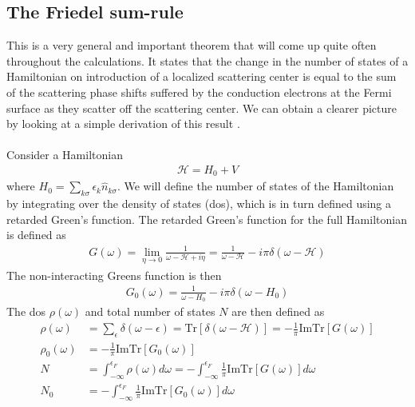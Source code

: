 \documentclass[twoside,11pt]{report}
\numberwithin{equation}{section}
\begin{document}
\subsection{The Friedel sum-rule}
This is a very general and important theorem that will come up  quite often throughout the calculations. It states that the change in the number of states of a Hamiltonian on introduction of a localized scattering center is equal to the sum of the scattering phase shifts suffered by the conduction electrons at the Fermi surface as they scatter off the scattering center. We can obtain a clearer picture by looking at a simple derivation of this result \cite{hewson}.
\\\\Consider a Hamiltonian
\begin{equation}\begin{aligned}
	\mathcal{H} = H_0 + V
\end{aligned}\end{equation}
where \(H_0 = \sum_{k\sigma}\epsilon_k \hat n_{k\sigma}\). We will define the number of states of the Hamiltonian by integrating over the density of states (dos), which is in turn defined using a retarded Green's function. The retarded Green's function for the full Hamiltonian is defined as
\begin{equation}\begin{aligned}
	G(\omega) = \lim_{\eta \to 0}\frac{1}{\omega - \mathcal{H} + i\eta} = \frac{1}{\omega - \mathcal{H}} - i\pi\delta\left(\omega - \mathcal{H}\right)
\end{aligned}\end{equation}
The non-interacting Greens function is then
\begin{equation}\begin{aligned}
	G_0(\omega) = \frac{1}{\omega - H_0} - i\pi\delta\left(\omega - H_0\right)
\end{aligned}\end{equation}
The dos \(\rho(\omega)\) and total number of states \(N\) are then defined as
\begin{equation}\begin{aligned}
	\rho(\omega) &= \sum_\epsilon \delta(\omega - \epsilon) = \text{Tr}\left[ \delta(\omega - \mathcal{H}) \right] = - \frac{1}{\pi}\text{Im} \text{Tr}\left[ G(\omega) \right]\\
	\rho_0(\omega) &=  -\frac{1}{\pi}\text{Im} \text{Tr}\left[ G_0(\omega) \right]\\
	N &= \int_{-\infty}^{\epsilon_F} \rho(\omega) d\omega = - \int_{-\infty}^{\epsilon_F} \frac{1}{\pi}\text{Im} \text{Tr}\left[ G(\omega) \right]d\omega\\
	N_0 &= - \int_{-\infty}^{\epsilon_F} \frac{1}{\pi}\text{Im} \text{Tr}\left[ G_0(\omega) \right]d\omega
\end{aligned}\end{equation}
\end{document}
